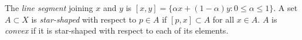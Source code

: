 The \emph{line segment} joining $x$ and $y$ is $[x, y] = \{\alpha x + (1-\alpha)y : 0 \leqslant \alpha \leqslant 1\}$. A set $A \subset X$ is \emph{star-shaped} with respect to $p \in A$ if $[p, x] \subset A$ for all $x \in A$. $A$ is \emph{convex} if it is star-shaped with respect to each of its elements.
